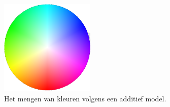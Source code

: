 \begin{figure}
%
%
    \centering\includegraphics[width=0.4\textwidth]{./img/raw/fw-kleur/colour-wheel2.png}
  \caption{Het mengen van kleuren volgens een additief model.}
  \label{fig:fw-kleur}
\end{figure}
